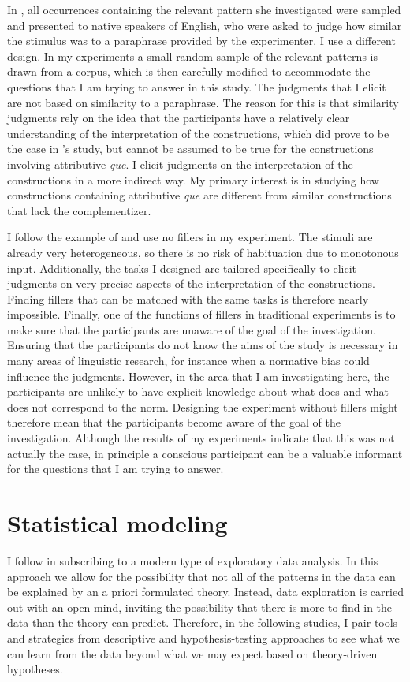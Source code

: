 In \citet{Degen2015}, all occurrences containing the relevant pattern she investigated were sampled and presented to native speakers of English, who were asked to judge how similar the stimulus was to a paraphrase provided by the experimenter. I use a different design. In my experiments a small random sample of the relevant patterns is drawn from a corpus, which is then carefully modified to accommodate the questions that I am trying to answer in this study. The judgments that I elicit are not based on  similarity to a paraphrase. The reason for this is that similarity judgments rely on the idea that the participants have a relatively clear understanding of the interpretation of the constructions, which did prove to be the case  in \citeauthor{Degen2015}'s study, but cannot be assumed to be true for the constructions involving attributive \emph{que}. I  elicit judgments on the interpretation of the constructions in a more indirect way. My primary interest is in studying how constructions containing attributive \emph{que} are different from similar constructions that lack the complementizer. 

I follow the example of \citeauthor{Degen2015} and use no fillers in my experiment. The stimuli are already very heterogeneous, so there is no risk of habituation due to  monotonous input. Additionally, the tasks I designed are tailored specifically to elicit judgments on very precise aspects of the interpretation of the constructions. Finding fillers that can be matched with the same tasks is therefore nearly impossible. Finally, one of the functions of fillers in traditional experiments is to make sure that the participants are unaware of the  goal of the investigation. Ensuring that the participants do not know the aims of the study is  necessary  in many areas of linguistic research, for instance when  a normative bias could influence the judgments. However, in the area that I am investigating here, the participants are unlikely to have explicit knowledge about what does and what does not correspond to the norm. Designing the experiment without fillers might therefore  mean that  the participants become aware of the goal of the investigation. Although the results of my experiments indicate that this was not actually the case, in principle a conscious participant can be a valuable informant for the questions that I am trying to answer.



\section{Statistical modeling}\label{sec:expstats}
I follow \citet{Baayen2008} in subscribing to a modern type of exploratory data analysis. In this approach we allow for the possibility that not all of the patterns in the data can be explained by an a priori formulated theory. Instead, data exploration is carried out with an open mind, inviting the possibility that there is more to find in the data than the theory can predict. Therefore, in the following studies, I pair tools and strategies from descriptive and hypothesis-testing approaches to see what we can learn from the data beyond what we may expect based on theory-driven hypotheses.



